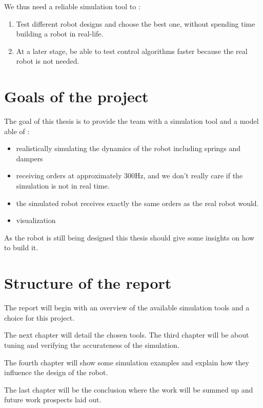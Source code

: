 We thus need a reliable simulation tool to :
\begin{enumerate}
\item Test different robot designs and choose the best one, without spending time building a robot in real-life.
\item At a later stage, be able to test control algorithms faster because the real robot is not needed.
\end{enumerate}

\section{Goals of the project}
The goal of this thesis is to provide the team with a simulation tool and a model able of :
\begin{itemize}
\item realistically simulating the dynamics of the robot including springs and dampers
\item receiving orders at approximately 300Hz, and we don't really care if the simulation is not in real time.
\item the simulated robot receives exactly the same orders as the real robot would.
\item visualization
\end{itemize}
As the robot is still being designed this thesis should give some insights on how to build it.

\section{Structure of the report}
The report will begin with an overview of the available simulation tools and a choice for this project.

The next chapter will detail the chosen tools. The third chapter will be about tuning and verifying the accurateness of the simulation.

The fourth chapter will show some simulation examples and explain how they influence the design of the robot.

The last chapter will be the conclusion where the work will be summed up and future work prospects laid out.